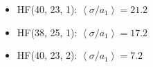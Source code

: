 \documentclass[bigger]{beamer}
\begin{document}
\begin{frame}
\begin{itemize}
\item HF(40, 23, 1): $\left<\sigma / a_{1}\right> = 21.2$
\label{sec-5-1-1-2}%

\item HF(38, 25, 1): $\left<\sigma / a_{1}\right> = 17.2$
\label{sec-5-1-1-3}%

\item HF(40, 23, 2): $\left<\sigma / a_{1}\right> = 7.2$
\label{sec-5-1-1-4}%
\end{itemize} %
\end{frame}
\end{document}
